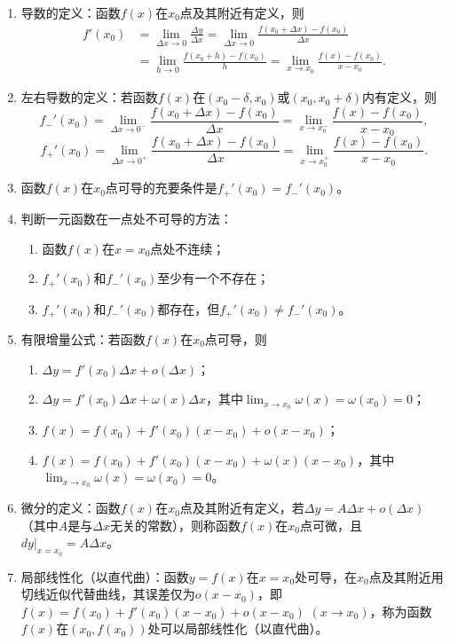 \documentclass[UTF8]{ctexart}
\theoremstyle{remark}
\begin{document}
			\begin{enumerate}
				\item 导数的定义：函数$f(x)$在$x_{0}$点及其附近有定义，则
				\[
				\begin{aligned}
					f'(x_{0}) & = \lim_{\Delta x \to 0} \frac{\Delta y}{\Delta x} = \lim_{\Delta x \to 0} \frac{f(x_{0}+\Delta x)-f(x_{0})}{\Delta x} \\
					& = \lim_{h \to 0} \frac{f(x_{0}+h)-f(x_{0})}{h} = \lim_{x \to x_{0}} \frac{f(x)-f(x_{0})}{x-x_{0}}.
				\end{aligned}
				\]
				
				\item 左右导数的定义：若函数$f(x)$在$(x_{0}-\delta, x_{0})$或$(x_{0}, x_{0}+\delta)$内有定义，则
				\[
				f_{-}'(x_{0}) = \lim_{\Delta x \to 0^{-}} \frac{f(x_{0}+\Delta x)-f(x_{0})}{\Delta x} = \lim_{x \to x_{0}^{-}} \frac{f(x)-f(x_{0})}{x-x_{0}},
				\]
				\[
				f_{+}'(x_{0}) = \lim_{\Delta x \to 0^{+}} \frac{f(x_{0}+\Delta x)-f(x_{0})}{\Delta x} = \lim_{x \to x_{0}^{+}} \frac{f(x)-f(x_{0})}{x-x_{0}}.
				\]
				
				\item 函数$f(x)$在$x_{0}$点可导的充要条件是$f_{+}'(x_{0}) = f_{-}'(x_{0})$。
				
				\item 判断一元函数在一点处不可导的方法：
				\begin{enumerate}
					\item 函数$f(x)$在$x = x_{0}$点处不连续；
					\item $f_{+}'(x_{0})$和$f_{-}'(x_{0})$至少有一个不存在；
					\item $f_{+}'(x_{0})$和$f_{-}'(x_{0})$都存在，但$f_{+}'(x_{0}) \neq f_{-}'(x_{0})$。
				\end{enumerate}
				
				\item 有限增量公式：若函数$f(x)$在$x_{0}$点可导，则
				\begin{enumerate}
					\item $\Delta y = f'(x_{0})\Delta x + o(\Delta x)$；
					\item $\Delta y = f'(x_{0})\Delta x + \omega(x)\Delta x$，其中$\lim_{x \to x_{0}} \omega(x) = \omega(x_{0}) = 0$；
					\item $f(x) = f(x_{0}) + f'(x_{0})(x - x_{0}) + o(x - x_{0})$；
					\item $f(x) = f(x_{0}) + f'(x_{0})(x - x_{0}) + \omega(x)(x - x_{0})$，其中$\lim_{x \to x_{0}} \omega(x) = \omega(x_{0}) = 0$。
				\end{enumerate}
				
				\item 微分的定义：函数$f(x)$在$x_{0}$点及其附近有定义，若$\Delta y = A\Delta x + o(\Delta x)$（其中$A$是与$\Delta x$无关的常数），则称函数$f(x)$在$x_{0}$点可微，且$dy|_{x=x_{0}} = A\Delta x$。
				
				\item 局部线性化（以直代曲）：函数$y = f(x)$在$x = x_{0}$处可导，在$x_{0}$点及其附近用切线近似代替曲线，其误差仅为$o(x - x_{0})$，即$f(x) = f(x_{0}) + f'(x_{0})(x - x_{0}) + o(x - x_{0})$ $(x \to x_{0})$，称为函数$f(x)$在$(x_{0}, f(x_{0}))$处可以局部线性化（以直代曲）。
			\end{enumerate}
\end{document}
